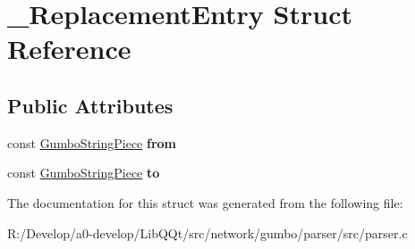 \hypertarget{struct___replacement_entry}{}\section{\+\_\+\+Replacement\+Entry Struct Reference}
\label{struct___replacement_entry}
\subsection*{Public Attributes}
\begin{DoxyCompactItemize}
\item 
\mbox{\label{struct___replacement_entry_af953885703274a3391a1d6a95ae12347}} 
const \mbox{\hyperlink{struct_gumbo_string_piece}{Gumbo\+String\+Piece}} {\bfseries from}
\item 
\mbox{\label{struct___replacement_entry_aa3b23f9277b7d6b102bbdc5418253069}} 
const \mbox{\hyperlink{struct_gumbo_string_piece}{Gumbo\+String\+Piece}} {\bfseries to}
\end{DoxyCompactItemize}


The documentation for this struct was generated from the following file\+:\begin{DoxyCompactItemize}
\item 
R\+:/\+Develop/a0-\/develop/\+Lib\+Q\+Qt/src/network/gumbo/parser/src/parser.\+c\end{DoxyCompactItemize}
